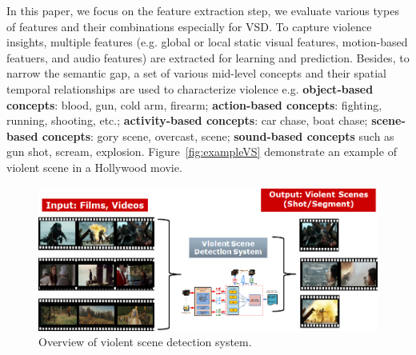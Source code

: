 \documentclass[twocolumn]{bmcart}%
\begin{document}
In this paper, we focus on the feature extraction step, we evaluate various types of features and their combinations especially for VSD. To capture violence insights, multiple features \cite{demarty2014benchmarking} (e.g. global or local static visual features, motion-based featuers, and audio features) are extracted for learning and prediction. Besides, to narrow the semantic gap, a set of various mid-level concepts and their spatial temporal relationships are used to characterize violence e.g. {\bf object-based concepts}: blood,  gun, cold arm, firearm; {\bf action-based concepts}: fighting, running, shooting, etc.; {\bf activity-based concepts}: car chase, boat chase; {\bf scene-based concepts}: gory scene, overcast, scene; {\bf sound-based concepts} such as gun shot, scream, explosion. Figure~\ref{fig:exampleVS} demonstrate an example of violent scene in a Hollywood movie. %
\begin{figure}[!t]
	\centering
	\includegraphics[width=2\linewidth]{Images/SystemOverview.png}
	\caption{Overview of violent scene detection system.}
	\label{fig:systemoverview}
\end{figure}
\end{document}
